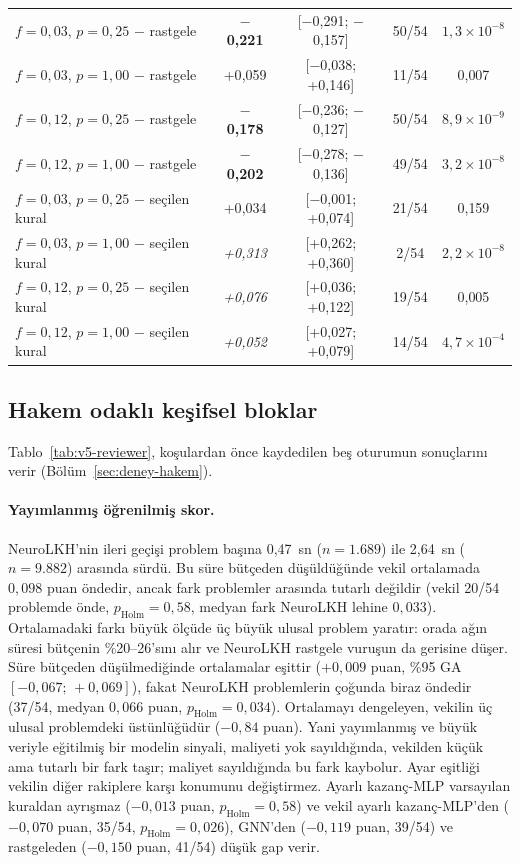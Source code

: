 \documentclass[pdflatex,sn-basic]{sn-jnl}
\newcommand{\iyi}[1]{\textcolor{iyiRenk}{\textbf{#1}}}
\newcommand{\kotu}[1]{\textcolor{kotuRenk}{\textit{#1}}}
\begin{document}
\begin{table}[!htbp]
\begin{tabular*}{\textwidth}{@{\extracolsep{\fill}}lcccc}
$f=0{,}03$, $p=0{,}25$ $-$ rastgele & \iyi{$-$0{,}221} & [$-$0{,}291; $-$0{,}157] & 50/54 & $1{,}3\times10^{-8}$ \\
$f=0{,}03$, $p=1{,}00$ $-$ rastgele & +0{,}059 & [$-$0{,}038; +0{,}146] & 11/54 & 0{,}007 \\
$f=0{,}12$, $p=0{,}25$ $-$ rastgele & \iyi{$-$0{,}178} & [$-$0{,}236; $-$0{,}127] & 50/54 & $8{,}9\times10^{-9}$ \\
$f=0{,}12$, $p=1{,}00$ $-$ rastgele & \iyi{$-$0{,}202} & [$-$0{,}278; $-$0{,}136] & 49/54 & $3{,}2\times10^{-8}$ \\
$f=0{,}03$, $p=0{,}25$ $-$ seçilen kural & +0{,}034 & [$-$0{,}001; +0{,}074] & 21/54 & 0{,}159 \\
$f=0{,}03$, $p=1{,}00$ $-$ seçilen kural & \kotu{+0{,}313} & [+0{,}262; +0{,}360] & 2/54 & $2{,}2\times10^{-8}$ \\
$f=0{,}12$, $p=0{,}25$ $-$ seçilen kural & \kotu{+0{,}076} & [+0{,}036; +0{,}122] & 19/54 & 0{,}005 \\
$f=0{,}12$, $p=1{,}00$ $-$ seçilen kural & \kotu{+0{,}052} & [+0{,}027; +0{,}079] & 14/54 & $4{,}7\times10^{-4}$ \\
\bottomrule
\end{tabular*}
\end{table}

\subsection{Hakem odaklı keşifsel bloklar}\label{sec:bulgular-hakem}

Tablo~\ref{tab:v5-reviewer}, koşulardan önce kaydedilen beş oturumun sonuçlarını verir
(Bölüm~\ref{sec:deney-hakem}).

\paragraph{Yayımlanmış öğrenilmiş skor.}
NeuroLKH'nin ileri geçişi problem başına 0,47~sn ($n=1.689$) ile 2,64~sn ($n=9.882$) arasında
sürdü. Bu süre bütçeden düşüldüğünde vekil ortalamada $0{,}098$ puan öndedir, ancak fark problemler
arasında tutarlı değildir (vekil 20/54 problemde önde, $p_{\mathrm{Holm}}=0{,}58$, medyan fark
NeuroLKH lehine $0{,}033$). Ortalamadaki farkı büyük ölçüde üç büyük ulusal problem yaratır: orada
ağın süresi bütçenin \%20--26'sını alır ve NeuroLKH rastgele vuruşun da gerisine düşer.
Süre bütçeden düşülmediğinde ortalamalar eşittir ($+0{,}009$ puan, \%95 GA $[-0{,}067;\,+0{,}069]$),
fakat NeuroLKH problemlerin çoğunda biraz öndedir (37/54, medyan $0{,}066$ puan,
$p_{\mathrm{Holm}}=0{,}034$). Ortalamayı dengeleyen, vekilin üç ulusal problemdeki üstünlüğüdür
($-0{,}84$ puan). Yani yayımlanmış ve büyük veriyle eğitilmiş bir modelin sinyali, maliyeti
yok sayıldığında, vekilden küçük ama tutarlı bir fark taşır; maliyet sayıldığında bu fark kaybolur.
Ayar eşitliği vekilin diğer rakiplere karşı konumunu değiştirmez. Ayarlı kazanç-MLP varsayılan
kuraldan ayrışmaz ($-0{,}013$ puan, $p_{\mathrm{Holm}}=0{,}58$) ve vekil ayarlı kazanç-MLP'den
($-0{,}070$ puan, 35/54, $p_{\mathrm{Holm}}=0{,}026$), GNN'den ($-0{,}119$ puan, 39/54) ve
rastgeleden ($-0{,}150$ puan, 41/54) düşük gap verir.
\end{document}
